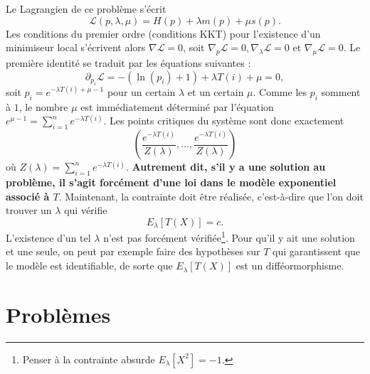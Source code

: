 \documentclass[
  10,
  letterpaper,
  DIV=11,
  numbers=noendperiod]{scrreport}
\theoremstyle{plain}
\theoremstyle{definition}
\theoremstyle{plain}
\theoremstyle{definition}
\theoremstyle{definition}
\theoremstyle{plain}
\theoremstyle{remark}
\begin{document}
Le Lagrangien de ce problème s'écrit
\[\mathscr{L}(p, \lambda, \mu) = H(p) + \lambda m(p) + \mu s(p). \] Les
conditions du premier ordre (conditions KKT) pour l'existence d'un
minimiseur local s'écrivent alors \(\nabla \mathscr{L}=0\), soit
\(\nabla_p \mathscr{L}=0, \nabla_\lambda \mathscr{L}=0\) et
\(\nabla_\mu \mathscr{L}=0\). Le première identité se traduit par les
équations suivantes :~
\[ \partial_{p_i}\mathscr{L} = -(\ln(p_i) + 1) + \lambda T(i) + \mu = 0, \]
soit \(p_i = e^{-\lambda T(i) + \mu-1}\) pour un certain \(\lambda\) et
un certain \(\mu\). Comme les \(p_i\) somment à \(1\), le nombre \(\mu\)
est immédiatement déterminé par l'équation
\(e^{\mu-1} = \sum_{i=1}^n e^{-\lambda T(i)}\). Les points critiques du
système sont donc exactement
\[\left(\frac{e^{-\lambda T(i)}}{Z(\lambda)}, \dotsc, \frac{e^{-\lambda T(i)}}{Z(\lambda)}\right)\]
où \(Z(\lambda) = \sum_{i=1}^n e^{-\lambda T(i)}\). \textbf{Autrement
dit, s'il y a une solution au problème, il s'agit forcément d'une loi
dans le modèle exponentiel associé à \(T\)}. Maintenant, la contrainte
doit être réalisée, c'est-à-dire que l'on doit trouver un \(\lambda\)
qui vérifie \[E_\lambda [T(X)] = c.\] L'existence d'un tel \(\lambda\)
n'est pas forcément vérifiée\footnote{Penser à la contrainte absurde
  \(E_\lambda[X^2]=-1\).}. Pour qu'il y ait une solution et une seule,
on peut par exemple faire des hypothèses sur \(T\) qui garantissent que
le modèle est identifiable, de sorte que \(E_\lambda [T(X)]\) est un
difféormorphisme.


\hypertarget{probluxe8mes}{%
\chapter*{Problèmes}\label{probluxe8mes}}

\end{document}

